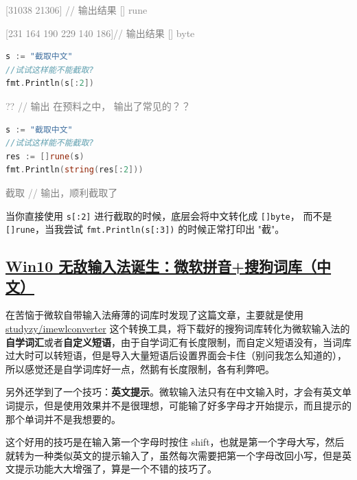 \begin{myquote}
\textcolor{gray}{[31038 21306] // 输出结果 [] rune}
\end{myquote}

\begin{myquote}
\textcolor{gray}{[231 164 190 229 140 186]// 输出结果 [] byte}
\end{myquote}

\begin{lstlisting}[language=go]
s := "截取中文"
//试试这样能不能截取?
fmt.Println(s[:2])
\end{lstlisting}

\begin{myquote}
\textcolor{gray}{?? // 输出 在预料之中， 输出了常见的？？}
\end{myquote}

\begin{lstlisting}[language=go]
s := "截取中文"
//试试这样能不能截取?
res := []rune(s)
fmt.Println(string(res[:2]))
\end{lstlisting}

\begin{myquote}
\textcolor{gray}{截取 // 输出，顺利截取了}
\end{myquote}

当你直接使用 \lstinline{s[:2]} 进行截取的时候，底层会将中文转化成 \lstinline{[]byte}， 而不是 \lstinline{[]rune}，当我尝试 \lstinline{fmt.Println(s[:3])} 的时候正常打印出 "截"。

\subsection{\href{https://baijiahao.baidu.com/s?id=1659926342373074716}{Win10 无敌输入法诞生：微软拼音+搜狗词库（中文）}}

在苦恼于微软自带输入法瘠薄的词库时发现了这篇文章，主要就是使用 \href{https://github.com/studyzy/imewlconverter}{studyzy/imewlconverter} 这个转换工具，将下载好的搜狗词库转化为微软输入法的\textbf{自学词汇}或者\textbf{自定义短语}，由于自学词汇有长度限制，而自定义短语没有，当词库过大时可以转短语，但是导入大量短语后设置界面会卡住（别问我怎么知道的），所以感觉还是自学词库好一点，然鹅有长度限制，各有利弊吧。

另外还学到了一个技巧：\textbf{英文提示}。微软输入法只有在中文输入时，才会有英文单词提示，但是使用效果并不是很理想，可能输了好多字母才开始提示，而且提示的那个单词并不是我想要的。

这个好用的技巧是在输入第一个字母时按住 shift，也就是第一个字母大写，然后就转为一种类似英文的提示输入了，虽然每次需要把第一个字母改回小写，但是英文提示功能大大增强了，算是一个不错的技巧了。

